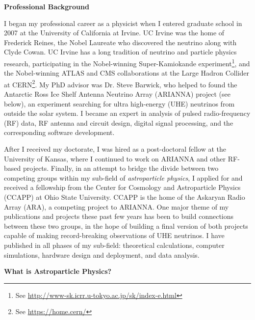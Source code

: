\documentclass[../main.tex]{subfiles}
\begin{document}
\textbf{Professional Background} \\ \hspace{0.1cm}

I began my professional career as a physicist when I entered graduate school in 2007 at the University of California at Irvine.  UC Irvine was the home of Frederick Reines, the Nobel Laureate who discovered the neutrino along with Clyde Cowan.  UC Irvine has a long tradition of neutrino and particle physics research, participating in the Nobel-winning Super-Kamiokande experiment\footnote{See \url{http://www-sk.icrr.u-tokyo.ac.jp/sk/index-e.html}}, and the Nobel-winning ATLAS and CMS collaborations at the Large Hadron Collider at CERN\footnote{See \url{https://home.cern/}}.  My PhD advisor was Dr. Steve Barwick, who helped to found the Antarctic Ross Ice Shelf Antenna Neutrino Array (ARIANNA) project (see below), an experiment searching for ultra high-energy (UHE) neutrinos from outside the solar system.  I became an expert in analysis of pulsed radio-frequency (RF) data, RF antenna and circuit design, digital signal processing, and the corresponding software development.  \\ \hspace{0.1cm}

After I received my doctorate, I was hired as a post-doctoral fellow at the University of Kansas, where I continued to work on ARIANNA and other RF-based projects.  Finally, in an attempt to bridge the divide between two competing groups within my sub-field of \textit{astroparticle physics}, I applied for and received a fellowship from the Center for Cosmology and Astroparticle Physics (CCAPP) at Ohio State University.  CCAPP is the home of the Askaryan Radio Array (ARA), a competing project to ARIANNA.  One major theme of my publications and projects these past few years has been to build connections between these two groups, in the hope of building a final version of both projects capable of making record-breaking observations of UHE neutrinos.  I have published in all phases of my sub-field: theoretical calculations, computer simulations, hardware design and deployment, and data analysis. \\ \hspace{0.1cm}
 
\textbf{What is Astroparticle Physics?} \\ \hspace{0.1cm}
\end{document}
